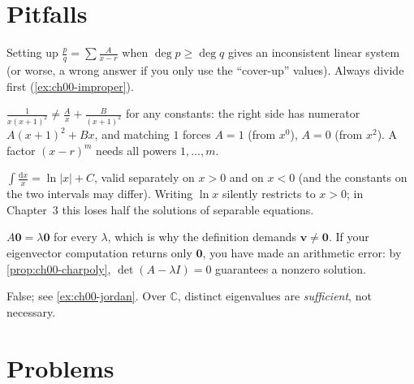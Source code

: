 \section{Pitfalls}\label{sec:ch00-pitfalls}

\begin{pitfall}\label{pit:ch00-improper}
Setting up $\frac{p}{q} = \sum\frac{A}{x - r}$ when $\deg p\ge\deg q$ gives an
inconsistent linear system (or worse, a wrong answer if you only use the
``cover-up'' values). Always divide first (\cref{ex:ch00-improper}).
\end{pitfall}

\begin{pitfall}\label{pit:ch00-repeated}
$\frac{1}{x(x+1)^2}\neq\frac{A}{x} + \frac{B}{(x+1)^2}$ for any constants: the
right side has numerator $A(x+1)^2 + Bx$, and matching $1$ forces $A=1$ (from
$x^0$), $A = 0$ (from $x^2$). A factor $(x-r)^m$ needs all powers
$1,\dots,m$.
\end{pitfall}

\begin{pitfall}\label{pit:ch00-ln-abs}
$\int\frac{\mathrm{d}x}{x} = \ln|x| + C$, valid separately on $x>0$ and on
$x<0$ (and the constants on the two intervals may differ). Writing $\ln x$
silently restricts to $x>0$; in Chapter~3 this loses half the solutions of
separable equations.
\end{pitfall}

\begin{pitfall}\label{pit:ch00-zero-eig}
$A\mathbf{0} = \lambda\mathbf0$ for every $\lambda$, which is why the
definition demands $\mathbf{v}\neq\mathbf{0}$. If your eigenvector computation
returns only $\mathbf0$, you have made an arithmetic error: by
\cref{prop:ch00-charpoly}, $\det(A - \lambda I) = 0$ guarantees a nonzero
solution.
\end{pitfall}

\begin{pitfall}\label{pit:ch00-all-diag}
False; see \cref{ex:ch00-jordan}. Over $\mathbb{C}$, distinct eigenvalues are
\emph{sufficient}, not necessary.
\end{pitfall}

\section{Problems}\label{sec:ch00-problems}


